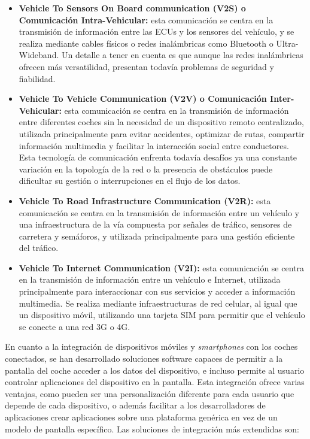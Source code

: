 \documentclass[12pt]{report} %
\begin{document}
\begin{itemize}

    \item \textbf{Vehicle To Sensors On Board communication (V2S) o Comunicación Intra-Vehicular:} esta comunicación se centra en la transmisión de información entre las ECUs y los sensores del vehículo, y se realiza mediante cables físicos o redes inalámbricas como Bluetooth o Ultra-Wideband. Un detalle a tener en cuenta es que aunque las redes inalámbricas ofrecen más versatilidad, presentan todavía problemas de seguridad y fiabilidad.
    \item \textbf{Vehicle To Vehicle Communication (V2V) o Comunicación Inter-Vehicular:} esta comunicación se centra en la transmisión de información entre diferentes coches sin la necesidad de un dispositivo remoto centralizado, utilizada principalmente para evitar accidentes, optimizar de rutas, compartir información multimedia y facilitar la interacción social entre conductores. Esta tecnología de comunicación enfrenta todavía desafíos ya una constante variación en la topología de la red o la presencia de obstáculos puede dificultar su gestión o interrupciones en el flujo de los datos.
    \item \textbf{Vehicle To Road Infrastructure Communication (V2R):} esta comunicación se centra en la transmisión de información entre un vehículo y una infraestructura de la vía compuesta por señales de tráfico, sensores de carretera y semáforos, y utilizada principalmente para una gestión eficiente del tráfico.
    \item \textbf{Vehicle To Internet Communication (V2I):} esta comunicación se centra en la transmisión de información entre un vehículo e Internet, utilizada principalmente para interaccionar con sus servicios y acceder a información multimedia. Se realiza mediante infraestructuras de red celular, al igual que un dispositivo móvil, utilizando una tarjeta SIM para permitir que el vehículo se conecte a una red 3G o 4G.

\end{itemize}

En cuanto a la integración de dispositivos móviles y \textit{smartphones} con los coches conectados, se han desarrollado soluciones software capaces de permitir a la pantalla del coche acceder a los datos del dispositivo, e incluso permite al usuario controlar aplicaciones del dispositivo en la pantalla. Esta integración ofrece varias ventajas, como pueden ser una personalización diferente para cada usuario que depende de cada dispositivo, o además facilitar a los desarrolladores de aplicaciones crear aplicaciones sobre una plataforma genérica en vez de un modelo de pantalla específico. Las soluciones de integración más extendidas son: 
\end{document}
